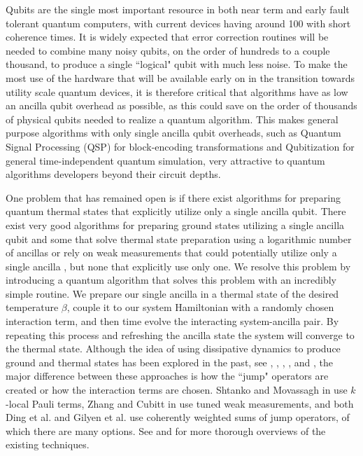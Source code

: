 \documentclass{article}
\begin{document}
Qubits are the single most important resource in both near term and early fault tolerant quantum computers, with current devices having around 100 with short coherence times. It is widely expected that error correction routines will be needed to combine many noisy qubits, on the order of hundreds to a couple thousand, to produce a single ``logical" qubit with much less noise. To make the most use of the hardware that will be available early on in the transition towards utility scale quantum devices, it is therefore critical that algorithms have as low an ancilla qubit overhead as possible, as this could save on the order of thousands of physical qubits needed to realize a quantum algorithm. This makes general purpose algorithms with only single ancilla qubit overheads, such as Quantum Signal Processing (QSP) for block-encoding transformations and Qubitization for general time-independent quantum simulation, very attractive to quantum algorithms developers beyond their circuit depths. 

One problem that has remained open is if there exist algorithms for preparing quantum thermal states that explicitly utilize only a single ancilla qubit. There exist very good algorithms for preparing ground states utilizing a single ancilla qubit \cite{ding2024single} and some that solve thermal state preparation using a logarithmic number of ancillas \cite{chen_fast_2022} or rely on weak measurements that could potentially utilize only a single ancilla \cite{zhang2023dissipative}, but none that explicitly use only one. We resolve this problem by introducing a quantum algorithm that solves this problem with an incredibly simple routine. We prepare our single ancilla in a thermal state of the desired temperature $\beta$, couple it to our system Hamiltonian with a randomly chosen interaction term, and then time evolve the interacting system-ancilla pair. By repeating this process and refreshing the ancilla state the system will converge to the thermal state. Although the idea of using dissipative dynamics to produce ground and thermal states has been explored in the past, see \cite{shtanko2023preparingthermalstatesnoiseless}, \cite{cubitt2023dissipativegroundstatepreparation}, \cite{zhang2023dissipative}, \cite{ding2024single}, and \cite{gilyen2024quantumgeneralizationsglaubermetropolis}, the major difference between these approaches is how the ``jump" operators are created or how the interaction terms are chosen. Shtanko and Movassagh in \cite{shtanko2023preparingthermalstatesnoiseless} use $k$-local Pauli terms, Zhang and Cubitt in \cite{zhang2023dissipative} use tuned weak measurements, and both Ding et al. \cite{ding2024single} and Gilyen et al. \cite{gilyen2024quantumgeneralizationsglaubermetropolis} use coherently weighted sums of jump operators, of which there are many options. See \cite{dalzell2023quantumalgorithmssurveyapplications} and \cite{chen2023quantumthermalstatepreparation} for more thorough overviews of the existing techniques.
\end{document}
